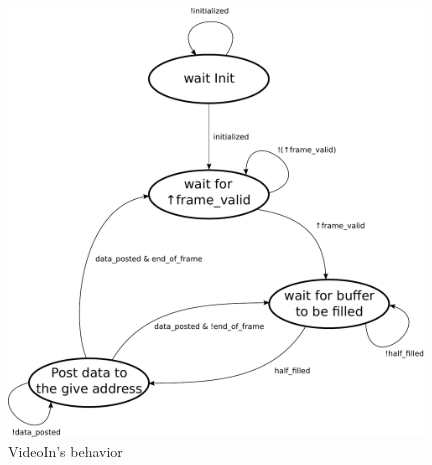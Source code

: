 \begin{figure}[h]
\center
\includegraphics[width=11cm]{figs/video_in_sm.pdf}
\caption{VideoIn's behavior}
\label{VideoIn_sm}
\end{figure}

